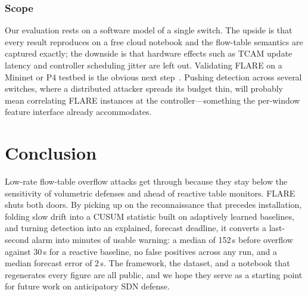 \documentclass[conference]{IEEEtran}
\begin{document}
\subsubsection{Scope} Our evaluation rests on a software model of a single
switch. The upside is that every result reproduces on a free cloud notebook and
the flow-table semantics are captured exactly; the downside is that hardware
effects such as TCAM update latency and controller scheduling jitter are left
out. Validating FLARE on a Mininet or P4 testbed is the obvious next
step~\cite{lantz2010mininet}. Pushing detection across several switches, where a
distributed attacker spreads its budget thin, will probably mean correlating
FLARE instances at the controller---something the per-window feature interface
already accommodates.

\section{Conclusion}\label{sec:conclusion}
Low-rate flow-table overflow attacks get through because they stay below the
sensitivity of volumetric defenses and ahead of reactive table monitors. FLARE
shuts both doors. By picking up on the reconnaissance that precedes
installation, folding slow drift into a CUSUM statistic built on adaptively
learned baselines, and turning detection into an explained, forecast deadline,
it converts a last-second alarm into minutes of usable warning: a median of
152\,s before overflow against 30\,s for a reactive baseline, no false positives
across any run, and a median forecast error of 2\,s. The framework, the
dataset, and a notebook that regenerates every figure are all public, and we
hope they serve as a starting point for future work on anticipatory SDN defense.



\end{document}
